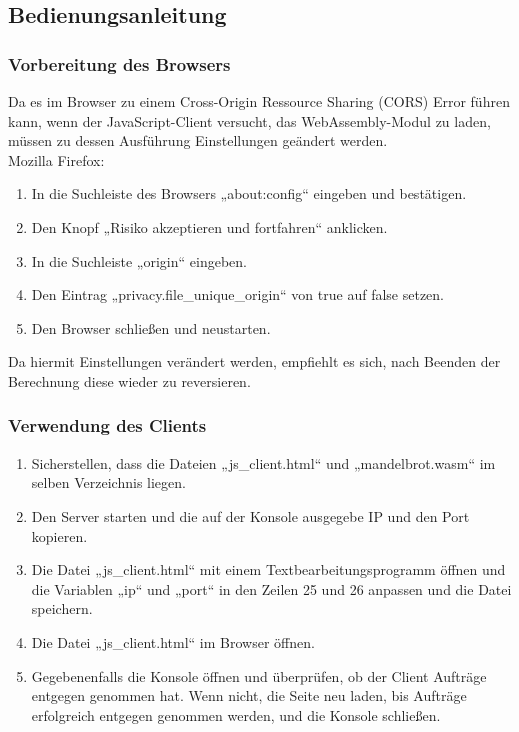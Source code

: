 \documentclass[12pt, onecolumn,notitlepage]{scrartcl}
\begin{document}
\subsection{Bedienungsanleitung}
\subsubsection{Vorbereitung des Browsers}
Da es im Browser zu einem Cross-Origin Ressource Sharing (CORS) Error führen kann, wenn der JavaScript-Client versucht, das WebAssembly-Modul zu laden, müssen zu dessen Ausführung Einstellungen geändert werden. \\
Mozilla Firefox: 
\begin{enumerate}
	\setlength\itemsep{0.07em}
	\item In die Suchleiste des Browsers „about:config“ eingeben und bestätigen.
	\item Den Knopf „Risiko akzeptieren und fortfahren“ anklicken.
	\item In die Suchleiste „origin“ eingeben.
	\item Den Eintrag „privacy.file\_unique\_origin“ von true auf false setzen.
	\item Den Browser schließen und neustarten.
\end{enumerate}
Da hiermit Einstellungen verändert werden, empfiehlt es sich, nach Beenden der Berechnung diese wieder zu reversieren.
\subsubsection{Verwendung des Clients}
\begin{enumerate}
	\setlength\itemsep{0.07em}
	\item Sicherstellen, dass die Dateien „js\_client.html“ und „mandelbrot.wasm“ im selben Verzeichnis liegen.
	\item Den Server starten und die auf der Konsole ausgegebe IP und den Port kopieren.
	\item Die Datei „js\_client.html“ mit einem Textbearbeitungsprogramm öffnen und die Variablen „ip“ und „port“ in den Zeilen 25 und 26 anpassen und die Datei speichern.
	\item Die Datei „js\_client.html“ im Browser öffnen.
	\item Gegebenenfalls die Konsole öffnen und überprüfen, ob der Client Aufträge entgegen genommen hat. Wenn nicht, die Seite neu laden, bis Aufträge erfolgreich entgegen genommen werden, und die Konsole schließen.
\end{enumerate}
\end{document}
